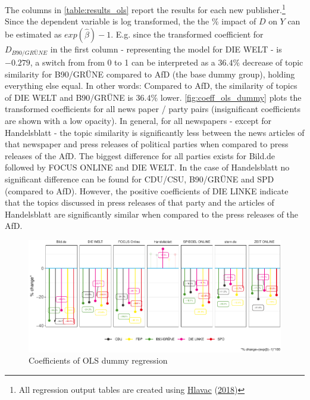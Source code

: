 \documentclass[
]{article}
\begin{document}
The columns in \autoref{table:results_ols} report the results for each
new publisher.\footnote{All regression output tables are created using
  \protect\hyperlink{ref-hlavac_stargazer_2018}{Hlavac}
  (\protect\hyperlink{ref-hlavac_stargazer_2018}{2018})} Since the
dependent variable is log transformed, the the \% impact of \(D\) on
\(Y\) can be estimated as \(exp(\hat\beta)-1\). E.g. since the
transformed coefficient for \(D_{B90/GRÜNE}\) in the first column -
representing the model for DIE WELT - is \(-0.279\), a switch from from
0 to 1 can be interpreted as a \(36.4\%\) decrease of topic similarity
for B90/GRÜNE compared to AfD (the base dummy group), holding everything
else equal. In other words: Compared to AfD, the similarity of topics of
DIE WELT and B90/GRÜNE is \(36.4\%\) lower.
\autoref{fig:coeff_ols_dummy} plots the transformed coefficients for all
news paper / party pairs (insignificant coefficients are shown with a
low opacity). In general, for all newspapers - except for Handelsblatt -
the topic similarity is significantly less between the news articles of
that newspaper and press releases of political parties when compared to
press releases of the AfD. The biggest difference for all parties exists
for Bild.de followed by FOCUS ONLINE and DIE WELT. In the case of
Handelsblatt no significant difference can be found for CDU/CSU,
B90/GRÜNE and SPD (compared to AfD). However, the positive coefficients
of DIE LINKE indicate that the topics discussed in press releases of
that party and the articles of Handelsblatt are significantly similar
when compared to the press releases of the AfD.

\begin{figure}

{\centering \includegraphics[width=1\linewidth]{main_text_files/figure-latex/Plot coefficients - simple dummy-1} 

}

\caption{Coefficients of OLS dummy regression \label{fig:coeff_ols_dummy}}\label{fig:Plot coefficients - simple dummy}
\end{figure}
\end{document}
